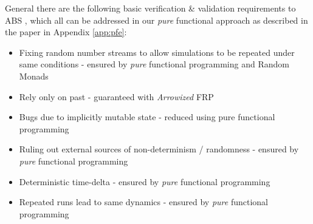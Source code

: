 General there are the following basic verification \& validation requirements to ABS \cite{robinson_simulation:_2014}, which all can be addressed in our \textit{pure} functional approach as described in the paper in Appendix \ref{app:pfe}:

\begin{itemize}
	\item Fixing random number streams to allow simulations to be repeated under same conditions - ensured by \textit{pure} functional programming and Random Monads
	\item Rely only on past - guaranteed with \textit{Arrowized} FRP
	\item Bugs due to implicitly mutable state - reduced using pure functional programming
	\item Ruling out external sources of non-determinism / randomness - ensured by \textit{pure} functional programming
	\item Deterministic time-delta - ensured by \textit{pure} functional programming
	\item Repeated runs lead to same dynamics - ensured by \textit{pure} functional programming
\end{itemize}

